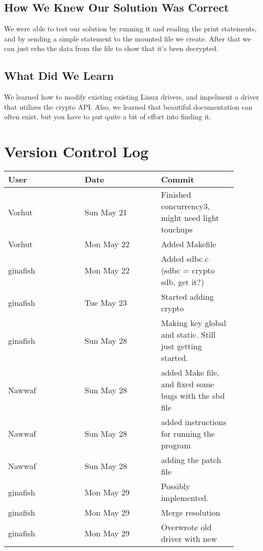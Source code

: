 \documentclass[draftclsnofoot,onecolumn,10pt]{IEEEtran}
\begin{document}
\subsection{How We Knew Our Solution Was Correct}
We were able to test our solution by running it and reading the print statements, and by sending a simple statement to the mounted file we create. After that we can just echo the data from the file to show that it's been decrypted.

\subsection{What Did We Learn}
We learned how to modify existing existing Linux drivers, and impelment a driver that utilizes the crypto API.  Also, we learned that beautiful documentation can often exist, but you have to put quite a bit of effort into finding it.


\section{Version Control Log}
\begin{center}
  \begin{tabular}{| p{0.3\linewidth} | p{0.3\linewidth} | p{0.3\linewidth} |}
  	\hline User & Date & Commit \\
  	\hline Vorhut & Sun May 21 & Finished concurrency3, might need light touchups \\
  	\hline Vorhut &  Mon May 22 & Added Makefile \\
  	\hline ginafish & Mon May 22 & Added sdbc.c (sdbc = crypto sdb, get it?)\\
	\hline ginafish & Tue May 23 & Started adding crypto \\
	\hline ginafish & Sun May 28 & Making key global and static. Still just getting started. \\
	\hline Nawwaf & Sun May 28 & added Make file, and fixed some bugs with the sbd file \\
	\hline Nawwaf & Sun May 28 & added instructions for running the program\\
    \hline Nawwaf & Sun May 28 & adding the patch file\\
    \hline ginafish & Mon May 29 & Possibly implemented.\\
    \hline ginafish & Mon May 29 & Merge resolution\\
    \hline ginafish & Mon May 29 & Overwrote old driver with new\\
  \hline
  \end{tabular}
\end{center}
\end{document}
